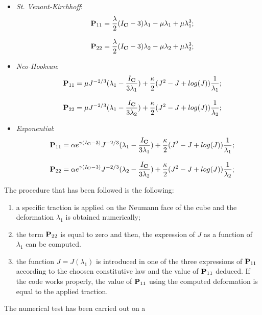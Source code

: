 \begin{itemize}
\item \textit{St. Venant-Kirchhoff}:
  \begin{equation}
    \begin{array}{lll} & \textbf{P}_{11}=\displaystyle
      \frac{\lambda}{2}(I_{\textbf{C}}-3)\lambda_1 - \mu\lambda_1 +
      \mu\lambda_1^3;\\ \\ & \textbf{P}_{22}=\displaystyle
      \frac{\lambda}{2}(I_{\textbf{C}}-3)\lambda_2 - \mu\lambda_2 + \mu\lambda_2^3;
    \end{array}
    \label{eq::P11SVK}
  \end{equation}
\item \textit{Neo-Hookean}:
  \begin{equation}
    \begin{array}{lll} & \textbf{P}_{11}=\displaystyle \mu J^{-2/3}
      (\lambda_1 - \frac{I_{\textbf{C}}}{3\lambda_1}) + \frac{\kappa}{2}(J^2 - J +
      log(J))\frac{1}{\lambda_1};\\ \\ & \textbf{P}_{22}=\displaystyle \mu
      J^{-2/3} (\lambda_1 - \frac{I_{\textbf{C}}}{3\lambda_2}) +
      \frac{\kappa}{2}(J^2 - J + log(J))\frac{1}{\lambda_2};
    \end{array}
    \label{eq::P11NH}
  \end{equation}
\item \textit{Exponential}:
  \begin{equation}
    \begin{array}{lll} & \textbf{P}_{11}=\displaystyle \alpha e^{\gamma\left(I_{\textbf{C}}-3\right)}
      J^{-2/3}(\lambda_1 - \frac{I_{\textbf{C}}}{3\lambda_1})+\frac{\kappa}{2}(J^2 -
      J + log(J))\frac{1}{\lambda_1};\\ \\ & \textbf{P}_{22}=\displaystyle
      \alpha e^{\gamma\left(I_{\textbf{C}}-3\right)} J^{-2/3}(\lambda_2 -
      \frac{I_{\textbf{C}}}{3\lambda_2})+\frac{\kappa}{2}(J^2 - J +
      log(J))\frac{1}{\lambda_2};
    \end{array}
    \label{eq::P11EXP}
  \end{equation}
\end{itemize} The procedure that has been followed is the following:
\begin{enumerate}
\item a specific traction is applied on the Neumann face of the cube
  and the deformation $\lambda_1$ is obtained numerically;
\item the term $\textbf{P}_{22}$ is equal to zero and then, the
  expression of $J$ as a function of $\lambda_1$ can be computed.
\item the function $J=J(\lambda_1)$ is introduced in one of the
  three expressions of $\textbf{P}_{11}$ according to the choosen
  constitutive law and the value of $\textbf{P}_{11}$ deduced. If the code
  works properly, the value of $\textbf{P}_{11}$ using the computed
  deformation is equal to the applied traction.
\end{enumerate} The numerical test has been carried out on a
